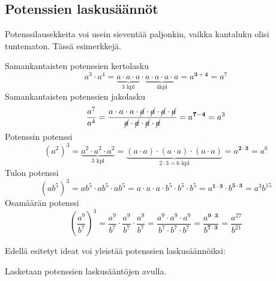     
\subsection*{Potenssien laskusäännöt}

Potenssilausekkeita voi usein sieventää paljonkin, vaikka kantaluku
olisi tuntematon. Tässä esimerkkejä.    
    
    Samankantaisten potenssien kertolasku
	\[
a^3\cdot a^4=\underbrace{a\cdot a\cdot a}_{\text{3 kpl}}\cdot \underbrace{a\cdot a\cdot a\cdot a}_{\text{4kpl}}=a^{\mathbf{3+4}}=a^7
    	\]
    Samankantaisten potenssien jakolasku
	\[
\frac{a^7}{a^4}=\frac{a\cdot a\cdot a\cdot \cancel{a}\cdot \cancel{a}\cdot \cancel{a}\cdot \cancel{a}}	{\cancel{a}\cdot \cancel{a}\cdot \cancel{a}\cdot \cancel{a}}=a^{\mathbf{7-4}}=a^3
    	\]
    Potenssin potenssi
	\[
(a^2)^3=\underbrace{a^2\cdot a^2\cdot a^2}_{3\text{ kpl}}=
\underbrace{(a\cdot a)\cdot (a\cdot a)\cdot (a\cdot a)}_{2\cdot 3=6\text{ kpl}}=a^{\boldsymbol{{2\cdot 3}}}=a^6
\]
    Tulon potenssi
	\[
(ab^5)^3=ab^5\cdot ab^5\cdot ab^5=a\cdot a\cdot a\cdot b^5\cdot b^5\cdot b^5=a^{\mathbf{1\cdot 3}}\cdot b^{\mathbf{5\cdot 3}}=a^3b^{15}
	\]
     Osamäärän potenssi
	\[
	\left(\frac{a^9}{b^7}\right)^3=\frac{a^9}{b^7}\cdot \frac{a^9}{b^7}\cdot \frac{a^9}{b^7}=\frac{a^9\cdot a^9\cdot a^9}{b^7\cdot b^7\cdot b^7}=\frac{a^{\mathbf{9\cdot 3}}}{b^{\mathbf{7\cdot 3}}}=\frac{a^{27}}{b^{21}}
	\]

 Edellä esitetyt ideat voi yleistää potenssien laskusäännöiksi:
    
 
    \begin{esimerkki}
        Lasketaan potenssien laskusääntöjen avulla.
        \begin{alakohdat}
         \end{alakohdat}
    \end{esimerkki} 
 
